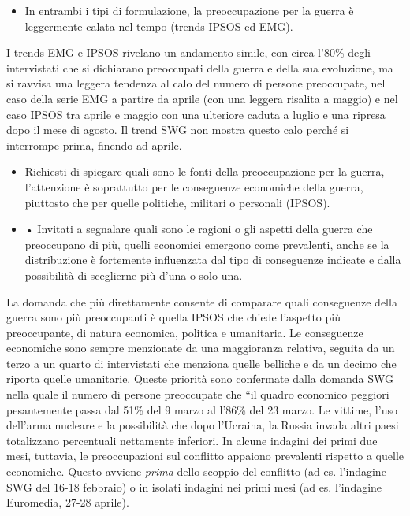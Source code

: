 \documentclass[
]{book}
\providecommand{\tightlist}{%
  \setlength{\itemsep}{0pt}\setlength{\parskip}{0pt}}
\begin{document}
\begin{itemize}
\tightlist
\item
  In entrambi i tipi di formulazione, la preoccupazione per la guerra è leggermente calata nel tempo (trends IPSOS ed EMG).
\end{itemize}

I trends EMG e IPSOS rivelano un andamento simile, con circa l'80\% degli intervistati che si dichiarano preoccupati della guerra e della sua evoluzione, ma si ravvisa una leggera tendenza al calo del numero di persone preoccupate, nel caso della serie EMG a partire da aprile (con una leggera risalita a maggio) e nel caso IPSOS tra aprile e maggio con una ulteriore caduta a luglio e una ripresa dopo il mese di agosto. Il trend SWG non mostra questo calo perché si interrompe prima, finendo ad aprile.

\begin{itemize}
\item
  Richiesti di spiegare quali sono le fonti della preoccupazione per la guerra, l'attenzione è soprattutto per le conseguenze economiche della guerra, piuttosto che per quelle politiche, militari o personali (IPSOS).
\item
  • Invitati a segnalare quali sono le ragioni o gli aspetti della guerra che preoccupano di più, quelli economici emergono come prevalenti, anche se la distribuzione è fortemente influenzata dal tipo di conseguenze indicate e dalla possibilità di sceglierne più d'una o solo una.
\end{itemize}

La domanda che più direttamente consente di comparare quali conseguenze della guerra sono più preoccupanti è quella IPSOS che chiede l'aspetto più preoccupante, di natura economica, politica e umanitaria. Le conseguenze economiche sono sempre menzionate da una maggioranza relativa, seguita da un terzo a un quarto di intervistati che menziona quelle belliche e da un decimo che riporta quelle umanitarie. Queste priorità sono confermate dalla domanda SWG nella quale il numero di persone preoccupate che ``il quadro economico peggiori pesantemente passa dal 51\% del 9 marzo al l'86\% del 23 marzo. Le vittime, l'uso dell'arma nucleare e la possibilità che dopo l'Ucraina, la Russia invada altri paesi totalizzano percentuali nettamente inferiori. In alcune indagini dei primi due mesi, tuttavia, le preoccupazioni sul conflitto appaiono prevalenti rispetto a quelle economiche. Questo avviene \emph{prima} dello scoppio del conflitto (ad es. l'indagine SWG del 16-18 febbraio) o in isolati indagini nei primi mesi (ad es. l'indagine Euromedia, 27-28 aprile).
\end{document}
